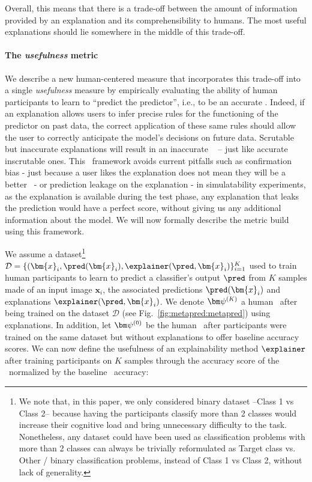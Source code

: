 Overall, this means that there is a trade-off between the amount of information provided by an explanation and its comprehensibility to humans. The most useful explanations should lie somewhere in the middle of this trade-off.

\paragraph{The {\em usefulness} metric} 

We describe a new human-centered measure that incorporates this trade-off into a single {\em usefulness} measure by empirically evaluating the ability of human participants to learn to ``predict the predictor'', i.e.,  to be an accurate \mp.
Indeed, if an explanation allows users to infer precise rules for the functioning of the predictor on past data, the correct application of these same rules should allow the user to correctly anticipate the model's decisions on future data. 
Scrutable but inaccurate explanations will result in an inaccurate \mp~ -- just like accurate inscrutable ones.
This \mp~framework avoids current pitfalls such as confirmation bias - just because a user likes the explanation does not mean they will be a better \mp~- or prediction leakage on the explanation - in simulatability experiments, as the explanation is available during the test phase, any explanation that leaks the prediction would have a perfect score, without giving us any additional information about the model. We will now formally describe the metric build using this framework.


We assume a dataset\footnote{We note that, in this paper, we only considered binary dataset --Class 1 vs Class 2-- because having the participants classify more than 2 classes would increase their cognitive load and bring unnecessary difficulty to the task. Nonetheless, any dataset could have been used as classification problems with more than 2 classes can always be trivially reformulated as Target class vs. Other / binary classification problems, instead of Class 1 vs Class 2, without lack of generality.} $\mathcal{D} = \{(\bm{x}_i, \pred(\bm{x}_i), \method(\pred, \bm{x}_i) \}_{i=1}^K$ used to train human participants to learn to predict a classifier's output $\pred$ from $K$ samples made of an input image $\bm{x}_i$, the associated  predictions $\pred(\bm{x}_i)$ and explanations $\method(\pred, \bm{x}_i)$. 
We denote $\metapred^{(K)}$ a human \mp~after being trained on the dataset $\mathcal{D}$ (see Fig.~\ref{fig:metapred:metapred}) using explanations. In addition, let $\metabase$ be the human \mp~after participants were trained on the same dataset but without explanations to offer baseline accuracy scores. 
We can now define the usefulness of an explainability method $\method$ after training participants on $K$ samples through the accuracy score of the \mp~normalized by the baseline \mp~accuracy:

